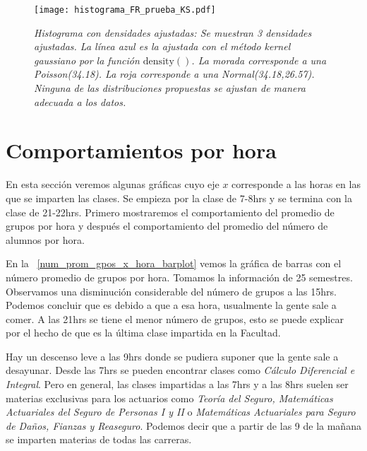 \begin{figure}[H]
\centering
\texttt{[image: histograma\_FR\_prueba\_KS.pdf]} %
\caption[\textit{Histograma con densidades ajustadas}]{\textit{Histograma con densidades ajustadas: Se muestran 3 densidades ajustadas. La línea azul es la ajustada con el método kernel gaussiano por la función $\mathrm{density()}$. La morada corresponde a una Poisson(34.18). La roja corresponde a una Normal(34.18,26.57). Ninguna de las distribuciones propuestas se ajustan de manera adecuada a los datos.}}\label{histFR_pruebaKS}
\end{figure}



\section{Comportamientos por hora}

En esta sección veremos algunas gráficas cuyo eje $x$ corresponde a las horas en las que se imparten las clases. Se empieza por la clase de 7-8hrs y se termina con la clase de 21-22hrs. Primero mostraremos el comportamiento del promedio de grupos por hora y después el comportamiento del promedio del número de alumnos por hora.

En la \figurename{~\ref{num_prom_gpos_x_hora_barplot}} vemos la gráfica de barras con el número promedio de grupos por hora. Tomamos la información de 25 semestres. Observamos una disminución considerable del número de grupos a las 15hrs. Podemos concluir que es debido a que a esa hora, usualmente la gente sale a comer. A las 21hrs se tiene el menor número de grupos, esto se puede explicar por el hecho de que es la última clase impartida en la Facultad.

Hay un descenso leve a las 9hrs donde se pudiera suponer que la gente sale a desayunar. Desde las 7hrs se pueden encontrar clases como \textit{Cálculo Diferencial e Integral}. Pero en general, las clases impartidas a las 7hrs y a las 8hrs suelen ser materias exclusivas para los actuarios como \textit{Teoría del Seguro, Matemáticas Actuariales del Seguro de Personas I y II} o \textit{Matemáticas Actuariales para Seguro de Daños, Fianzas y Reaseguro}. Podemos decir que a partir de las 9 de la mañana se imparten materias de todas las carreras.

